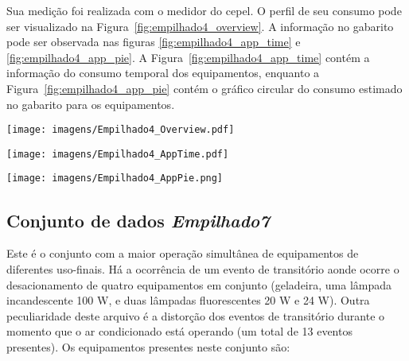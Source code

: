 Sua medição foi realizada com o medidor do \acs{cepel}. O perfil de seu
consumo pode ser visualizado na Figura~\ref{fig:empilhado4_overview}.
A informação no gabarito pode ser observada nas figuras
\ref{fig:empilhado4_app_time} e \ref{fig:empilhado4_app_pie}.  A
Figura~\ref{fig:empilhado4_app_time} contém a informação do consumo
temporal dos equipamentos, enquanto a
Figura~\ref{fig:empilhado4_app_pie} contém o gráfico circular do
consumo estimado no gabarito para os equipamentos.

\begin{sidewaysfigure}[p]
\centering
\texttt{[image: imagens/Empilhado4\_Overview.pdf]}
\caption{Perfil de consumo agregado para o conjunto de dados \emph{Empilhado4}.}
\label{fig:empilhado4_overview}
\end{sidewaysfigure}

\begin{sidewaysfigure}[p]
\centering
\texttt{[image: imagens/Empilhado4\_AppTime.pdf]}
\caption{Informação no gabarito para o conjunto de dados
\emph{Empilhado4}: consumo temporal dos equipamentos.}
\label{fig:empilhado4_app_time}
\end{sidewaysfigure}

\begin{sidewaysfigure}[p]
\centering
\texttt{[image: imagens/Empilhado4\_AppPie.png]}
\caption{Informação no gabarito para o conjunto de dados
\emph{Empilhado4}: gráfico circular do consumo dos equipamentos.}
\label{fig:empilhado4_app_pie}
\end{sidewaysfigure}

\FloatBarrier

\subsection{Conjunto de dados \emph{Empilhado7}}
\label{ssec:emp7}

Este é o conjunto com a maior operação simultânea de equipamentos de
diferentes uso-finais. Há a ocorrência de um evento de transitório
aonde ocorre o desacionamento de quatro equipamentos em conjunto
(geladeira, uma lâmpada incandescente 100 W, e duas lâmpadas
fluorescentes 20 W e 24 W). Outra peculiaridade deste arquivo é a
distorção dos eventos de transitório durante o momento que o ar
condicionado está operando (um total de 13 eventos presentes). Os
equipamentos presentes neste conjunto são:

